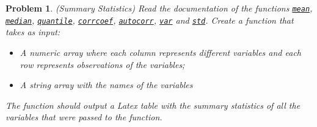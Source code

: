 \documentclass[12pt, a4paper]{article}
\newtheorem{problem}{Problem}
\begin{document}
\begin{problem}
(Summary Statistics) Read the documentation of the functions \href{https://www.mathworks.com/help/matlab/ref/mean.html?s\_tid=doc\_ta}{\texttt{mean}}, \href{https://www.mathworks.com/help/matlab/ref/median.html?s\_tid=doc\_ta}{\texttt{median}}, \href{https://www.mathworks.com/help/stats/quantile.html?s\_tid=doc\_ta}{\texttt{quantile}}, \href{https://www.mathworks.com/help/matlab/ref/corrcoef.html?s\_tid=doc\_ta}{\texttt{corrcoef}}, \href{https://www.mathworks.com/help/econ/autocorr.html?s\_tid=doc\_ta}{\texttt{autocorr}}, \href{https://www.mathworks.com/help/matlab/ref/var.html?s\_tid=doc\_ta}{\texttt{var}} and \href{https://www.mathworks.com/help/matlab/ref/std.html}{\texttt{std}}.
Create a function that takes as input:
\begin{itemize}
\item A numeric array where each column represents different variables and each row represents observations of the variables;
\item A string array with the names of the variables
\end{itemize}
The function should output a Latex table with the summary statistics of all the variables that were passed to the function.
\end{problem}
\newpage
\printbibliography
\newpage
\end{document}
